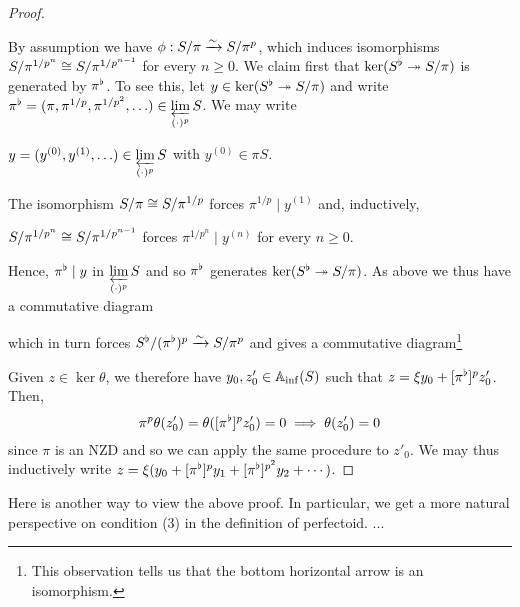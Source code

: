 \documentclass[11pt]{article}
\begin{document}
\begin{proof}
\begin{enum}{\alph}
\item By assumption we have $\phi: S/\pi\xrightarrow{\sim}S/\pi^p$, which induces isomorphisms $S/\pi^{1/p^n}\cong S/\pi^{1/p^{n-1}}$ for every $n\geq0$. We claim first that $\ker(S^{\flat}\twoheadrightarrow S/\pi)$ is generated by $\pi^{\flat}$. To see this, let $y\in\ker(S^{\flat}\twoheadrightarrow S/\pi)$ and write $\pi^{\flat}=(\pi,\pi^{1/p},\pi^{1/p^2},\ldots)\in\displaystyle\varprojlim_{(\cdot)^p}S$. We may write 
\begin{center}
$y=(y^{(0)},y^{(1)},\ldots)\in\displaystyle\varprojlim_{(\cdot)^p}S$ with $y^{(0)}\in\pi S$.
\end{center} 
The isomorphism $S/\pi\cong S/\pi^{1/p}$ forces $\pi^{1/p}\mid y^{(1)}$ and, inductively, 
\begin{center}
$S/\pi^{1/p^n}\cong S/\pi^{1/p^{n-1}}$ forces $\pi^{1/p^n}\mid y^{(n)}$ for every $n\geq0$.
\end{center}
Hence, $\pi^{\flat}\mid y$ in $\displaystyle\varprojlim_{(\cdot)^p}S$ and so $\pi^{\flat}$ generates $\ker(S^{\flat}\twoheadrightarrow S/\pi)$. As above we thus have a commutative diagram
\begin{center}
\end{center}
which in turn forces $S^{\flat}/(\pi^{\flat})^p\xrightarrow{\sim}S/\pi^p$ and gives a commutative diagram\footnote{This observation tells us that the bottom horizontal arrow is an isomorphism.}
\begin{center}
\end{center}
\end{enum}
Given $z\in\ker\theta$, we therefore have $y_0,z'_0\in\mathbb{A}_{\inf}(S)$ such that $z=\xi y_0+[\pi^{\flat}]^pz'_0$. Then,
$$\pi^p\theta(z'_0)=\theta([\pi^{\flat}]^pz'_0)=0\implies\theta(z'_0)=0$$
since $\pi$ is an NZD and so we can apply the same procedure to $z'_0$. We may thus inductively write $z=\xi(y_0+[\pi^{\flat}]^py_1+[\pi^{\flat}]^{p^2}y_2+\cdots)$.
\end{proof}

\begin{remark}
Here is another way to view the above proof. In particular, we get a more natural perspective on condition \textup{(3)} in the definition of perfectoid. ...
\end{remark}
\end{document}
